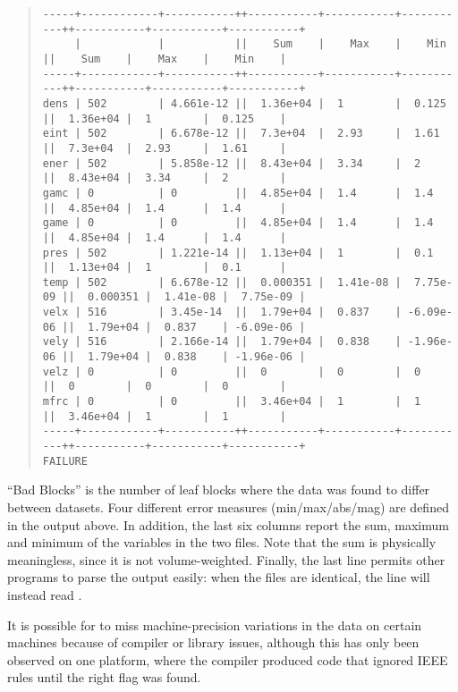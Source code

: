 \begin{quote}
\begin{tiny}
\begin{samepage}
\begin{verbatim}
-----+------------+-----------++-----------+-----------+-----------++-----------+-----------+-----------+
     |            |           ||    Sum    |    Max    |    Min    ||    Sum    |    Max    |    Min    |
-----+------------+-----------++-----------+-----------+-----------++-----------+-----------+-----------+
dens | 502        | 4.661e-12 ||  1.36e+04 |  1        |  0.125    ||  1.36e+04 |  1        |  0.125    |
eint | 502        | 6.678e-12 ||  7.3e+04  |  2.93     |  1.61     ||  7.3e+04  |  2.93     |  1.61     |
ener | 502        | 5.858e-12 ||  8.43e+04 |  3.34     |  2        ||  8.43e+04 |  3.34     |  2        |
gamc | 0          | 0         ||  4.85e+04 |  1.4      |  1.4      ||  4.85e+04 |  1.4      |  1.4      |
game | 0          | 0         ||  4.85e+04 |  1.4      |  1.4      ||  4.85e+04 |  1.4      |  1.4      |
pres | 502        | 1.221e-14 ||  1.13e+04 |  1        |  0.1      ||  1.13e+04 |  1        |  0.1      |
temp | 502        | 6.678e-12 ||  0.000351 |  1.41e-08 |  7.75e-09 ||  0.000351 |  1.41e-08 |  7.75e-09 |
velx | 516        | 3.45e-14  ||  1.79e+04 |  0.837    | -6.09e-06 ||  1.79e+04 |  0.837    | -6.09e-06 |
vely | 516        | 2.166e-14 ||  1.79e+04 |  0.838    | -1.96e-06 ||  1.79e+04 |  0.838    | -1.96e-06 |
velz | 0          | 0         ||  0        |  0        |  0        ||  0        |  0        |  0        |
mfrc | 0          | 0         ||  3.46e+04 |  1        |  1        ||  3.46e+04 |  1        |  1        |
-----+------------+-----------++-----------+-----------+-----------++-----------+-----------+-----------+
FAILURE
\end{verbatim}
\end{samepage}
\end{tiny}
\end{quote}

``Bad Blocks'' is the number of leaf blocks where the data was found to differ
between datasets. Four different error measures (min/max/abs/mag) are defined
in the output above. In addition, the last six columns report the sum, maximum
and minimum of the variables in the two files. Note that the sum is physically
meaningless, since it is not volume-weighted. Finally, the last line permits
other programs to parse the  output easily: when the files
are identical, the line will instead read .

It is possible for  to miss machine-precision variations in the data
on certain machines because of compiler or library issues, although this has
only been observed on one platform, where the compiler produced code that
ignored IEEE rules until the right flag was found.

